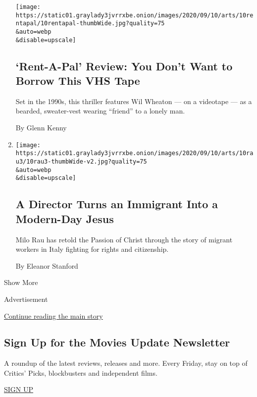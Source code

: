 \begin{enumerate}
  \texttt{[image: https://static01.graylady3jvrrxbe.onion/images/2020/09/10/arts/10rentapal/10rentapal-thumbWide.jpg?quality=75\\\&auto=webp\\\&disable=upscale]}

  \hypertarget{rent-a-pal-review-you-dont-want-to-borrow-this-vhs-tape}{%
  \subsection{`Rent-A-Pal' Review: You Don't Want to Borrow This VHS
  Tape}\label{rent-a-pal-review-you-dont-want-to-borrow-this-vhs-tape}}

  Set in the 1990s, this thriller features Wil Wheaton --- on a
  videotape --- as a bearded, sweater-vest wearing ``friend'' to a
  lonely man.

  By Glenn Kenny
\item
  \href{/2020/09/10/movies/milo-rau-the-new-gospel.html}{}

  \texttt{[image: https://static01.graylady3jvrrxbe.onion/images/2020/09/10/arts/10rau3/10rau3-thumbWide-v2.jpg?quality=75\\\&auto=webp\\\&disable=upscale]}

  \hypertarget{a-director-turns-an-immigrant-into-a-modern-day-jesus}{%
  \subsection{A Director Turns an Immigrant Into a Modern-Day
  Jesus}\label{a-director-turns-an-immigrant-into-a-modern-day-jesus}}

  Milo Rau has retold the Passion of Christ through the story of migrant
  workers in Italy fighting for rights and citizenship.

  By Eleanor Stanford
\end{enumerate}

Show More

Advertisement

\protect\hyperlink{after-mid2}{Continue reading the main story}

\hypertarget{sign-up-for-the-movies-update-newsletter}{%
\subsection{Sign Up for the Movies Update
Newsletter}\label{sign-up-for-the-movies-update-newsletter}}

A roundup of the latest reviews, releases and more. Every Friday, stay
on top of Critics' Picks, blockbusters and independent films.

\href{/newsletters/signup/FM}{SIGN UP}

